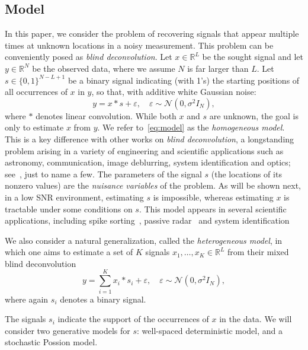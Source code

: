\documentclass[12pt]{article}
\newcommand{\1}{\mathbf{1}}
\newcommand{\RL}{\mathbb{R}^L}
\newcommand{\RN}{\mathbb{R}^N}
\theoremstyle{plain}
\theoremstyle{definition}
\theoremstyle{remark}
\theoremstyle{plain}
\theoremstyle{remark}
\theoremstyle{plain}
\theoremstyle{plain}
\begin{document}
\subsection{Model}

In this paper, we consider the problem of recovering signals that appear 
multiple times at unknown locations in a noisy measurement. This problem can be conveniently posed as  \emph{blind deconvolution}.
Let $x\in\RL$ be the sought signal and let $y\in\RN$ be the observed data, where we assume $N$ is  far larger than $L$. Let  $s \in \{0, 1\}^{N-L+1}$ be a binary signal indicating (with 1's) the starting positions of all occurrences of $x$ in $y$, so that, with additive white Gaussian noise:
\begin{equation} 
y  =  x \ast s + \varepsilon, \quad  \varepsilon   \sim \mathcal{N}(0,\sigma^2 I_N),
\label{eq:model}
\end{equation}
where $\ast$ denotes linear convolution. 
While both $x$ and $s$ are unknown, the goal is only to estimate $x$ from $y$. 
We refer to~\eqref{eq:model} as the \emph{homogeneous model}.
This is a key difference with other works on  \emph{blind deconvolution}, a longstanding problem arising in a variety of engineering and scientific applications such as astronomy, communication, image deblurring, system identification and optics; see~\cite{jefferies1993restoration,shalvi1990new,ayers1988iterative,abed1997blind}, just to name a few. 
The parameters of the signal $s$ (the locations of its nonzero values) are the \emph{nuisance variables} of the problem. As will be shown next, in a low SNR environment, estimating $s$ is impossible, whereas estimating $x$ is tractable under some conditions on $s$. 
This model appears in several scientific applications, including spike sorting~\cite{lewicki1998review}, passive radar~\cite{gogineni2017passive} and system identification~\cite{ljung1998system}

We also consider a natural generalization, called the \emph{heterogeneous model}, in which one aims to estimate a set of $K$ signals $x_1,\ldots,x_K\in\RL$ from their mixed blind deconvolution
\begin{equation} 
y  =  \sum_{i=1}^Kx_i \ast s_i + \varepsilon, \quad  \varepsilon   \sim \mathcal{N}(0,\sigma^2 I_N),
\label{eq:model}
\end{equation}
where again $s_i$ denotes a binary signal. 

The signals $s_i$ indicate the support of the occurrences of $x$ in the data. We will consider two generative models for $s$: well-spaced deterministic model, and a stochastic Possion model.
\end{document}
